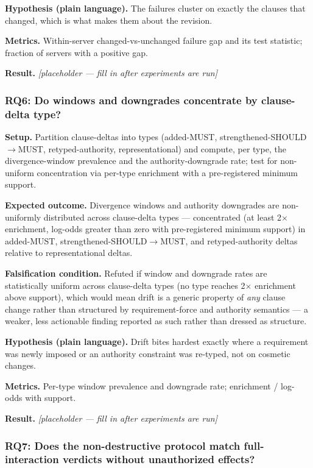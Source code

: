 \documentclass[11pt]{article}
\newcommand{\ph}{\textit{[placeholder --- fill in after experiments are run]}}
\begin{document}
\textbf{Hypothesis (plain language).} The failures cluster on exactly the clauses that changed, which is what makes them about the revision.

\textbf{Metrics.} Within-server changed-vs-unchanged failure gap and its test statistic; fraction of servers with a positive gap.

\textbf{Result.} \ph

\subsubsection{RQ6: Do windows and downgrades concentrate by clause-delta type?}

\textbf{Setup.} Partition clause-deltas into types (added-MUST, strengthened-SHOULD$\to$MUST, retyped-authority, representational) and compute, per type, the divergence-window prevalence and the authority-downgrade rate; test for non-uniform concentration via per-type enrichment with a pre-registered minimum support.

\textbf{Expected outcome.} Divergence windows and authority downgrades are non-uniformly distributed across clause-delta types --- concentrated (at least 2$\times$ enrichment, log-odds greater than zero with pre-registered minimum support) in added-MUST, strengthened-SHOULD$\to$MUST, and retyped-authority deltas relative to representational deltas.

\textbf{Falsification condition.} Refuted if window and downgrade rates are statistically uniform across clause-delta types (no type reaches 2$\times$ enrichment above support), which would mean drift is a generic property of \emph{any} clause change rather than structured by requirement-force and authority semantics --- a weaker, less actionable finding reported as such rather than dressed as structure.

\textbf{Hypothesis (plain language).} Drift bites hardest exactly where a requirement was newly imposed or an authority constraint was re-typed, not on cosmetic changes.

\textbf{Metrics.} Per-type window prevalence and downgrade rate; enrichment / log-odds with support.

\textbf{Result.} \ph

\subsubsection{RQ7: Does the non-destructive protocol match full-interaction verdicts without unauthorized effects?}
\end{document}
